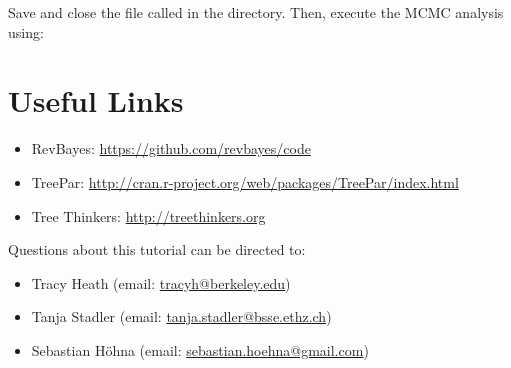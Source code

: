 {\begin{framed}
Save and close the file called {\textcolor{red}{}} in the  directory. 
Then, execute the MCMC analysis using: \colorbox{shadecolor}{}
\end{framed}}


\bigskip
\section*{Useful Links}

\begin{itemize}
\item RevBayes: \href{https://github.com/revbayes/code}{https://github.com/revbayes/code} \\ \vspace{-7mm}
\item TreePar: \href{http://cran.r-project.org/web/packages/TreePar/index.html}{http://cran.r-project.org/web/packages/TreePar/index.html} \\ \vspace{-7mm}
\item Tree Thinkers: \href{http://treethinkers.org/}{http://treethinkers.org} \\ \vspace{-7mm}
\end{itemize}

Questions about this tutorial can be directed to: \\\vspace{-10mm}
\begin{itemize}
\item Tracy Heath (email: \href{mailto:tracyh@berkeley.edu}{tracyh@berkeley.edu}) \\\vspace{-8mm}
\item Tanja Stadler (email: \href{mailto:tanja.stadler@bsse.ethz.ch}{tanja.stadler@bsse.ethz.ch}) \\\vspace{-8mm} 
\item Sebastian H\"{o}hna (email: \href{mailto:sebastian.hoehna@gmail.com}{sebastian.hoehna@gmail.com})
\end{itemize}
